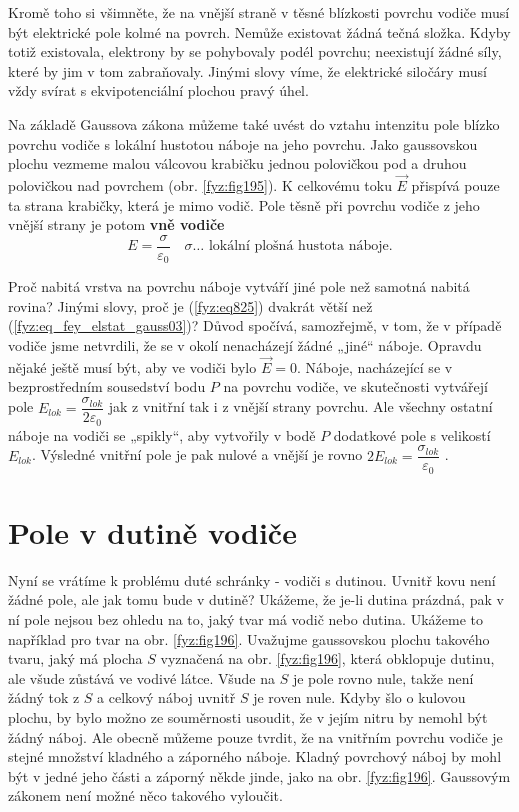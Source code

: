   Kromě toho si všimněte, že na vnější straně v těsné blízkosti povrchu vodiče musí být 
  elektrické pole kolmé na povrch. Nemůže existovat žádná tečná složka. Kdyby totiž existovala, 
  elektrony by se pohybovaly podél povrchu; neexistují žádné síly, které by jim v tom 
  zabraňovaly. Jinými slovy víme, že elektrické siločáry musí vždy svírat s ekvipotenciální 
  plochou pravý úhel.
  
  Na základě Gaussova zákona můžeme také uvést do vztahu intenzitu pole blízko povrchu vodiče s 
  lokální hustotou náboje na jeho povrchu. Jako gaussovskou plochu vezmeme malou válcovou 
  krabičku jednou polovičkou pod a druhou polovičkou nad povrchem (obr. 
  \ref{fyz:fig195}). K celkovému toku \(\vec{E}\) přispívá pouze ta strana 
  krabičky, která je mimo vodič. Pole těsně při povrchu vodiče z jeho vnější strany je potom 
  \textbf{vně vodiče}
  \begin{equation}\label{fyz:eq825}
    E = \frac{\sigma}{\varepsilon_0}  \quad\text{\(\sigma\ldots\) lokální plošná hustota 
    náboje}.
  \end{equation}
  
  Proč nabitá vrstva na povrchu náboje vytváří jiné pole než samotná nabitá rovina? Jinými 
  slovy, proč je (\ref{fyz:eq825}) dvakrát větší než 
  (\ref{fyz:eq_fey_elstat_gauss03})? Důvod spočívá, samozřejmě, v tom, že v případě vodiče jsme 
  netvrdili, že se v okolí nenacházejí žádné „jiné“ náboje. Opravdu nějaké ještě musí být, aby 
  ve vodiči bylo \(\vec{E} = 0\). Náboje, nacházející se v bezprostředním sousedství bodu \(P\) 
  na povrchu vodiče, ve skutečnosti vytvářejí pole \(E_{lok}= 
  \dfrac{\sigma_{lok}}{2\varepsilon_0}\) jak z vnitřní tak i z vnější strany povrchu. Ale 
  všechny ostatní náboje na vodiči se „spikly“, aby vytvořily v bodě \(P\) dodatkové pole s 
  velikostí \(E_{lok}\). Výsledné vnitřní pole je pak nulové a vnější je rovno \(2E_{lok} = 
  \dfrac{\sigma_{lok}}{\varepsilon_0}\) \cite[s.~93]{Feynman02}.
  
\section{Pole v dutině vodiče}\label{fyz:IIchapVsecIX}
  Nyní se vrátíme k problému duté schránky - vodiči s dutinou. Uvnitř kovu není žádné pole, ale 
  jak tomu bude v dutině? Ukážeme, že je-li dutina prázdná, pak v ní pole nejsou bez ohledu na 
  to, jaký tvar má vodič nebo dutina. Ukážeme to například pro tvar na obr. \ref{fyz:fig196}. 
  Uvažujme gaussovskou plochu takového tvaru, jaký má plocha \(S\) vyznačená na obr. 
  \ref{fyz:fig196}, která obklopuje dutinu, ale všude zůstává ve vodivé látce. Všude na \(S\) je 
  pole rovno nule, takže není žádný tok z \(S\) a celkový náboj uvnitř \(S\) je roven nule. Kdyby 
  šlo o kulovou plochu, by bylo možno ze souměrnosti usoudit, že v jejím nitru by nemohl být žádný 
  náboj. Ale obecně můžeme pouze tvrdit, že na vnitřním povrchu vodiče je stejné množství kladného 
  a záporného náboje. Kladný povrchový náboj by mohl být v jedné jeho části a záporný někde jinde, 
  jako na obr. \ref{fyz:fig196}. Gaussovým zákonem není možné něco takového vyloučit.
  
